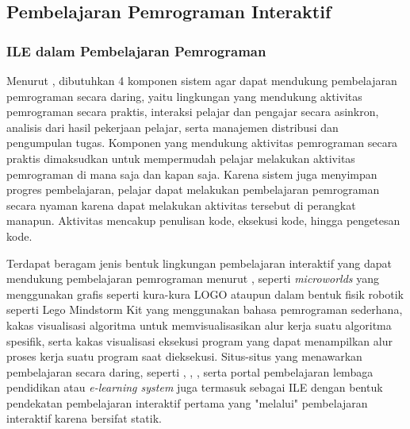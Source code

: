 \subsection{Pembelajaran Pemrograman Interaktif}
\subsubsection{ILE dalam Pembelajaran Pemrograman}
Menurut \textcite{choy2004interactive}, dibutuhkan 4 komponen sistem agar dapat mendukung pembelajaran pemrograman secara daring, yaitu lingkungan yang mendukung aktivitas pemrograman secara praktis, interaksi pelajar dan pengajar secara asinkron, analisis dari hasil pekerjaan pelajar, serta manajemen distribusi dan pengumpulan tugas. Komponen yang mendukung aktivitas pemrograman secara praktis dimaksudkan untuk mempermudah pelajar melakukan aktivitas pemrograman di mana saja dan kapan saja. Karena sistem juga menyimpan progres pembelajaran, pelajar dapat melakukan pembelajaran pemrograman secara nyaman karena dapat melakukan aktivitas tersebut di perangkat manapun. Aktivitas mencakup penulisan kode, eksekusi kode, hingga pengetesan kode.

Terdapat beragam jenis bentuk lingkungan pembelajaran interaktif yang dapat mendukung pembelajaran pemrograman menurut \textcite{moons2013pilot}, seperti \textit{microworlds} yang menggunakan grafis seperti kura-kura LOGO ataupun dalam bentuk fisik robotik seperti Lego Mindstorm Kit yang menggunakan bahasa pemrograman sederhana, kakas visualisasi algoritma untuk memvisualisasikan alur kerja suatu algoritma spesifik, serta kakas visualisasi eksekusi program yang dapat menampilkan alur proses kerja suatu program saat dieksekusi. Situs-situs yang menawarkan pembelajaran secara daring, seperti \textcite{sololearn2021media}, \textcite{codesaya2021media}, \textcite{brilliant2021media}, serta portal pembelajaran lembaga pendidikan atau \textit{e-learning system} juga termasuk sebagai ILE dengan bentuk pendekatan pembelajaran interaktif pertama yang "melalui" pembelajaran interaktif karena bersifat statik.


